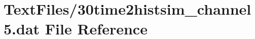 \hypertarget{30time2histsim__channel5_8dat}{}\section{Text\+Files/30time2histsim\+\_\+channel5.dat File Reference}
\label{30time2histsim__channel5_8dat}
